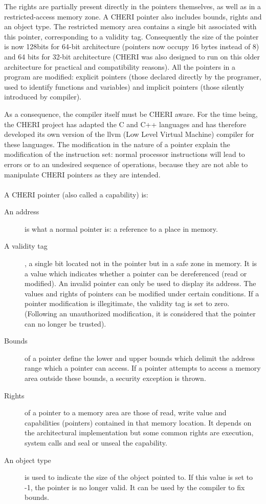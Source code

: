 \documentclass[a4paper, 11pt]{article}
\begin{document}
The rights are partially present directly in the pointers themselves, as well as in a restricted-access memory zone. A CHERI pointer also includes bounds, rights and an object type. 
The restricted memory area contains a single bit associated with this pointer, corresponding to a validity tag.
Consequently the size of the pointer is now 128bits for 64-bit architecture (pointers now occupy 16 bytes instead of 8) and 64 bits for 32-bit architecture (CHERI was also designed to run on this older architecture for practical and compatibility reasons). 
All the pointers in a program are modified: explicit pointers (those declared directly by the programer, used to identify functions and variables) and implicit pointers (those silently introduced by compiler).

As a consequence, the compiler itself must be CHERI aware. For the time being, the CHERI project has adapted the C and C++ languages and has therefore developed its own version of the \acrshort{llvm} (Low Level Virtual Machine) compiler for these languages.
The modification in the nature of a pointer explain the modification of the instruction set: normal processor instructions will lead to errors or to an undesired sequence of operations, because they are not able to manipulate CHERI pointers as they are intended. 
\\\\
A CHERI pointer (also called a capability) is:
\begin{description}
	\item[An address] is what a normal pointer is: a reference to a place in memory.
	\item[A validity tag], a single bit located not in the pointer but in a safe zone in memory. It is a value which indicates whether a pointer can be dereferenced (read or modified). An invalid pointer can only be used to display its address. The values and rights of pointers can be modified under certain conditions. If a pointer modification is illegitimate, the validity tag is set to zero. (Following an unauthorized modification, it is considered that the pointer can no longer be trusted). 
	\item[Bounds] of a pointer define the lower and upper bounds which delimit the address range which a pointer can access. If a pointer attempts to access a memory area outside these bounds, a security exception is thrown.
	\item[Rights] of a pointer to a memory area are those of read, write value and capabilities (pointers) contained in that memory location. It depends on the architectural implementation but some common rights are execution, system calls and seal or unseal the capability.
	\item[An object type] is used to indicate the size of the object pointed to. If this value is set to -1, the pointer is no longer valid. It can be used by the compiler to fix bounds.
 \end{description}
\end{document}
